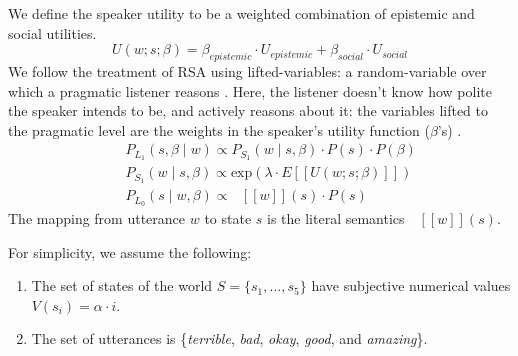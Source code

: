 \documentclass[10pt,letterpaper]{article}
\newcommand{\denote}[1]{\mbox{ $[\![ #1 ]\!]$}}
\newcommand{\ndg}[1]{\textcolor{Green}{[ndg: #1]}}
\newcommand{\mht}[1]{\textcolor{DarkOrange}{[mht: #1]}}
\newcommand{\ejy}[1]{\textcolor{Blue}{[ejy: #1]}}
\begin{document}
We define the speaker utility to be a weighted combination of epistemic and social utilities.
$$
U(w;s; \beta) = \beta_{epistemic}\cdot U_{epistemic} + \beta_{social} \cdot U_{social}
$$
%
%
We follow the treatment of RSA using lifted-variables: a random-variable over which a pragmatic listener reasons \cite{GoodmanLassiter2015, Kao2014, Degen2015}.
Here, the listener doesn't know how polite the speaker intends to be, and actively reasons about it: the variables lifted to the pragmatic level are the weights in the speaker's utility function ($\beta$'s) .
%
\begin{eqnarray}
&&P_{L_1}(s, \beta \mid w)\propto P_{S_1}(w \mid s, \beta)\cdot P(s) \cdot P(\beta) \label{eq:L1}\\
&&P_{S_1}(w \mid s, \beta) \propto \mathrm{exp}(\lambda \cdot E[[U(w; s; \beta)]])\label{eq:S1}\\
&&P_{L_0}(s \mid w, \beta)\propto \denote{w}(s) \cdot P(s) \label{eq:L0}
\end{eqnarray}
The mapping from utterance $w$ to state $s$ is the literal semantics $\denote{w}(s)$.

%
For simplicity, we assume the following:
\begin{enumerate}
\item The set of states of the world $S = \{s_{1}, ...,  s_{5}\}$ have subjective numerical values $V(s_{i}) = \alpha \cdot i$. 
\item The set of utterances is \{\emph{terrible}, \emph{bad}, \emph{okay}, \emph{good}, and \emph{amazing}\}.
\end{enumerate}
\end{document}
